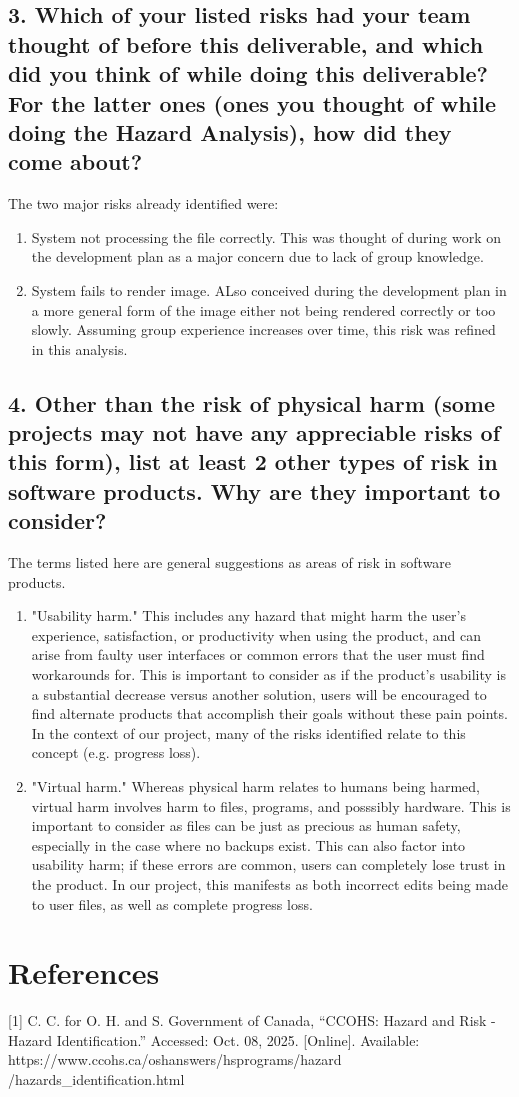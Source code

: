 \documentclass{article}
\begin{document}
\subsection*{3. Which of your listed risks had your team thought of before this
deliverable, and which did you think of while doing this deliverable? For
the latter ones (ones you thought of while doing the Hazard Analysis), how
did they come about?}
The two major risks already identified were:
\begin{enumerate}
    \item System not processing the file correctly. This was thought of during work on the development plan as a major concern due to lack of group knowledge.
    \item System fails to render image. ALso conceived during the development plan in a more general form of the image either not being rendered correctly or too slowly. Assuming group experience increases over time, this risk was refined in this analysis.
\end{enumerate}

\subsection*{4. Other than the risk of physical harm (some projects may not have any
appreciable risks of this form), list at least 2 other types of risk in
software products. Why are they important to consider?}
The terms listed here are general suggestions as areas of risk in software products.
\begin{enumerate}
    \item "Usability harm." This includes any hazard that might harm the user's experience, satisfaction, or productivity when using the product, and can arise from faulty user interfaces or common errors that the user must find workarounds for. This is important to consider as if the product's usability is a substantial decrease versus another solution, users will be encouraged to find alternate products that accomplish their goals without these pain points. In the context of our project, many of the risks identified relate to this concept (e.g. progress loss).
    \item "Virtual harm." Whereas physical harm relates to humans being harmed, virtual harm involves harm to files, programs, and posssibly hardware. This is important to consider as files can be just as precious as human safety, especially in the case where no backups exist. This can also factor into usability harm; if these errors are common, users can completely lose trust in the product. In our project, this manifests as both incorrect edits being made to user files, as well as complete progress loss.
\end{enumerate}


\section*{References}

[1]  C. C. for O. H. and S. Government of Canada, “CCOHS: Hazard and Risk - Hazard Identification.”
Accessed: Oct. 08, 2025. [Online]. Available: https://www.ccohs.ca/oshanswers/hsprograms/hazard
/hazards\_identification.html
\end{document}
